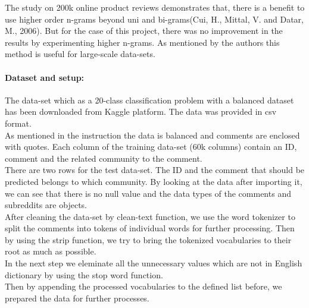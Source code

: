 \documentclass[12pt]{report}
\begin{document}
	The study on 200k online product reviews demonstrates that, there is a benefit to use higher order n-grams beyond uni and bi-grams(Cui, H., Mittal, V. and Datar, M., 2006). But for the case of this project, there was no improvement in the results by experimenting higher n-grams.
	As mentioned by the authors this method is useful for large-scale data-sets. \\
	
	
	
	\paragraph{Dataset and setup:}
	The data-set which as a 20-class classification problem with a balanced
	dataset has been downloaded from Kaggle platform. The data was provided in csv format.\\
	As mentioned in the instruction the data is balanced and comments are enclosed with quotes.
	Each column of the training data-set (60k columns) contain an ID, comment and the related community to the comment.\\
	There are two rows for the test data-set. The ID and the comment that should be predicted belongs to which community.
	By looking at the data after importing it, we can see that there is no null value and the data types of the comments and subreddits are objects. \\
	After cleaning the data-set by clean-text function, we use the word tokenizer to split the comments into tokens of individual words for further processing. Then by using the strip function, we try to bring the tokenized vocabularies to their root as much as possible.\\
	In the next step we eleminate all the unnecessary values which are not in English dictionary by using the stop word function. \\
	Then by appending the processed vocabularies to the defined list before, we prepared the data for further processes. \\
	
	
	
\end{document}
